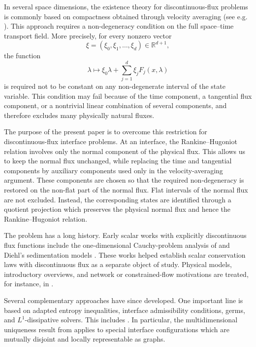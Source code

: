 \documentclass[11pt]{amsart}
\numberwithin{equation}{section}
\theoremstyle{plain}
\theoremstyle{definition}
\theoremstyle{remark}
\begin{document}
In several space dimensions, the existence theory for discontinuous-flux
problems is commonly based on compactness obtained through velocity averaging (see e.g. \cite{AleksicMitrovic2009,Mitrovic2025Nondegenerate,Panov_arma}).
This approach requires a non-degeneracy condition on the full space--time
transport field. More precisely, for every nonzero vector
\[
    \xi=(\xi_0,\xi_1,\ldots,\xi_d)\in\mathbb R^{d+1},
\]
the function
\[
    \lambda\longmapsto
    \xi_0\lambda+\sum_{j=1}^d\xi_jF_j(x,\lambda)
\]
is required not to be constant on any non-degenerate interval of the state
variable. This condition may fail because of the time component, a tangential
flux component, or a nontrivial linear combination of several components, and
therefore excludes many physically natural fluxes.

The purpose of the present paper is to overcome this restriction for
discontinuous-flux interface problems. At an interface, the
Rankine--Hugoniot relation involves only the normal component of the physical
flux. This allows us to keep the normal flux unchanged, while replacing the
time and tangential components by auxiliary components used only in the
velocity-averaging argument. These components are chosen so that the required
non-degeneracy is restored on the non-flat part of the normal flux. Flat
intervals of the normal flux are not excluded. Instead, the corresponding
states are identified through a quotient projection which preserves the
physical normal flux and hence the Rankine--Hugoniot relation.

The problem has a long history. Early scalar works with explicitly
discontinuous flux functions include the one-dimensional Cauchy-problem
analysis of \cite{GimseRisebro1992} and Diehl's sedimentation models
\cite{Diehl1995,DiehlCMP1996}. These works helped establish scalar
conservation laws with discontinuous flux as a separate object of study.
Physical models, introductory overviews, and network or constrained-flow
motivations are treated, for instance, in
\cite{AndreianovDiscConstraint2010,Buerger2008,ColomboGoatin2007,GNPT2007}.

Several complementary approaches have since developed. One important line is
based on adapted entropy inequalities, interface admissibility conditions,
germs, and \(L^1\)-dissipative solvers. This includes
\cite{AdimurthiJHDE2005,AdimurthiNHM2007,AKR-NHM,AKR,AM,AudussePerthame2005}.
In particular, the multidimensional uniqueness result from \cite{AM} applies
to special interface configurations which are mutually disjoint and locally
representable as graphs.
\end{document}
